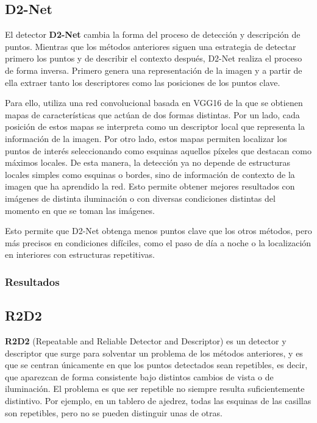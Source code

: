\subsection{D2-Net}

El detector \textbf{D2-Net} \cite{dusmanu2019d2net} cambia la forma del proceso de detección y descripción de puntos. Mientras que los métodos anteriores siguen una estrategia de detectar primero los puntos y de describir el contexto después, D2-Net realiza el proceso de forma inversa. Primero genera una representación de la imagen y a partir de ella extraer tanto los descriptores como las posiciones de los puntos clave.

Para ello, utiliza una red convolucional basada en VGG16 de la que se obtienen mapas de características que actúan de dos formas distintas. Por un lado, cada posición de estos mapas se interpreta como un descriptor local que representa la información de la imagen. Por otro lado, estos mapas permiten localizar los puntos de interés seleccionando como esquinas aquellos píxeles que destacan como máximos locales. De esta manera, la detección ya no depende de estructuras locales simples como esquinas o bordes, sino de información de contexto de la imagen que ha aprendido la red. Esto permite obtener mejores resultados con imágenes de distinta iluminación o con diversas condiciones distintas del momento en que se toman las imágenes.

Esto permite que D2-Net obtenga menos puntos clave que los otros métodos, pero más precisos en condiciones difíciles, como el paso de día a noche o la localización en interiores con estructuras repetitivas.

\subsubsection{Resultados}


\subsection{R2D2}

\textbf{R2D2} (Repeatable and Reliable Detector and Descriptor) \cite{revaud2019r2d2} es un detector y descriptor que surge para solventar un problema de los métodos anteriores, y es que se centran únicamente en que los puntos detectados sean repetibles, es decir, que aparezcan de forma consistente bajo distintos cambios de vista o de iluminación. El problema es que ser repetible no siempre resulta suficientemente distintivo. Por ejemplo, en un tablero de ajedrez, todas las esquinas de las casillas son repetibles, pero no se pueden distinguir unas de otras.  

